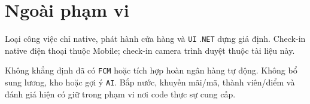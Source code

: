 \clearpage
\section{Ngoài phạm vi}\label{sec:srs-24}
Loại công việc chỉ native, phát hành cửa hàng và \texttt{UI} .\texttt{NET} dựng giả định. Check-in native điện thoại thuộc Mobile; check-in camera trình duyệt thuộc tài liệu này.

Không khẳng định đã có \texttt{FCM} hoặc tích hợp hoàn ngân hàng tự động. Không bổ sung lương, kho hoặc gợi ý \texttt{AI}. Bắp nước, khuyến mãi/\allowbreak{}mã, thành viên/\allowbreak{}điểm và đánh giá hiện có giữ trong phạm vi nơi code thực sự cung cấp.

